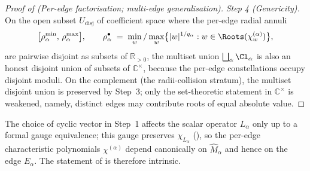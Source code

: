 \begin{proof}[Proof of  (Per-edge factorisation; multi-edge
generalisation)]
\smallskip
\textit{Step 4 (Genericity).}
On the open subset $U_{\mathrm{disj}}$ of coefficient space where
the per-edge radial annuli
\[
   \big[\rho_\alpha^{\min},\, \rho_\alpha^{\max}\big],
   \qquad
   \rho_\alpha^{\bullet}
   \;=\;
   \min_w / \max_w\!\big\{|w|^{1/q_\alpha} : w \in
   \Roots(\chi_w^{(\alpha)})\big\},
\]
are pairwise disjoint as subsets of $\mathbb{R}_{> 0}$, the multiset
union $\bigsqcup_\alpha \Cl_\alpha$ is also an honest disjoint union
of subsets of $\mathbb{C}^\times$, because the per-edge constellations
occupy disjoint moduli. On the complement (the radii-collision
stratum), the multiset disjoint union is preserved by Step~3; only
the set-theoretic statement in $\mathbb{C}^\times$ is weakened,
namely, distinct edges may contribute roots of equal absolute value.
\end{proof}

\begin{remark}\label{rem:M1-cyclic-vector}
The choice of cyclic vector in Step~1 affects the scalar operator
$L_\alpha$ only up to a formal gauge equivalence; this gauge preserves
$\chi_{L_\alpha}$ (), so the per-edge
characteristic polynomials $\chi^{(\alpha)}$ depend canonically on
$\widehat{M}_\alpha$ and hence on the edge $E_\alpha$. The statement
of  is therefore intrinsic.
\end{remark}




